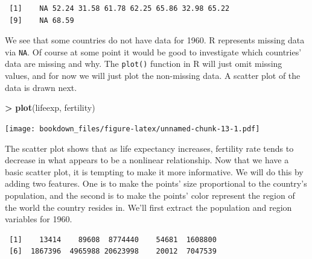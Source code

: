 \documentclass[
]{krantz}
\makeatletter
\newenvironment{Shaded}{\begin{snugshade}}{\end{snugshade}}
\newcommand{\DecValTok}[1]{\textcolor[rgb]{0.06,0.06,0.06}{#1}}
\newcommand{\KeywordTok}[1]{\textcolor[rgb]{0.27,0.27,0.27}{\textbf{#1}}}
\newcommand{\NormalTok}[1]{#1}
\newcommand{\OperatorTok}[1]{\textcolor[rgb]{0.43,0.43,0.43}{\textbf{#1}}}
\newcommand{\StringTok}[1]{\textcolor[rgb]{0.5,0.5,0.5}{#1}}
\newenvironment{kframe}{%
\medskip{}
\setlength{\fboxsep}{.8em}
 \def\at@end@of@kframe{}%
 \ifinner\ifhmode%
  \def\at@end@of@kframe{\end{minipage}}%
  \begin{minipage}{\columnwidth}%
 \fi\fi%
 \def\FrameCommand##1{\hskip\@totalleftmargin \hskip-\fboxsep
 \colorbox{shadecolor}{##1}\hskip-\fboxsep
     \hskip-\linewidth \hskip-\@totalleftmargin \hskip\columnwidth}%
 \MakeFramed {\advance\hsize-\width
   \@totalleftmargin\z@ \linewidth\hsize
   \@setminipage}}%
 {\par\unskip\endMakeFramed%
 \at@end@of@kframe}
\renewenvironment{Shaded}{\begin{kframe}}{\end{kframe}}
\makeatother
\begin{document}
\begin{verbatim}
 [1]    NA 52.24 31.58 61.78 62.25 65.86 32.98 65.22
 [9]    NA 68.59
\end{verbatim}

We see that some countries do not have data for 1960. R represents missing data via \texttt{NA}. Of course at some point it would be good to investigate which countries' data are missing and why. The \texttt{plot()} function in R will just omit missing values, and for now we will just plot the non-missing data. A scatter plot of the data is drawn next.

\begin{Shaded}
\begin{Highlighting}[]
\OperatorTok{\textgreater{}}\StringTok{ }\KeywordTok{plot}\NormalTok{(lifeexp, fertility)}
\end{Highlighting}
\end{Shaded}

\texttt{[image: bookdown\_files/figure-latex/unnamed-chunk-13-1.pdf]}

The scatter plot shows that as life expectancy increases, fertility rate tends to decrease in what appears to be a nonlinear relationship. Now that we have a basic scatter plot, it is tempting to make it more informative. We will do this by adding two features. One is to make the points' size proportional to the country's population, and the second is to make the points' color represent the region of the world the country resides in. We'll first extract the population and region variables for 1960.

\begin{Shaded}
\end{Shaded}

\begin{verbatim}
 [1]    13414    89608  8774440    54681  1608800
 [6]  1867396  4965988 20623998    20012  7047539
\end{verbatim}
\end{document}
